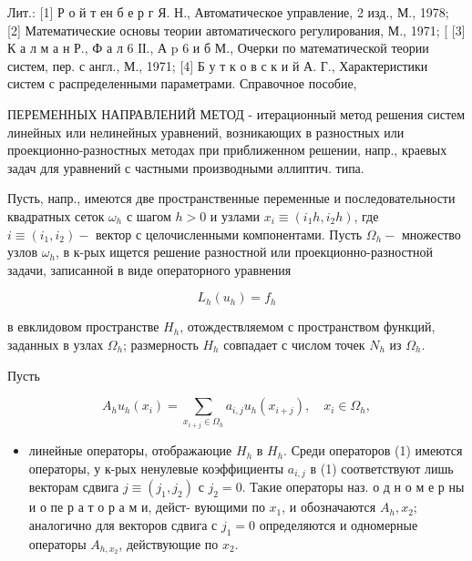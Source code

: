 \documentclass[10pt]{article}
\begin{document}
Лит.: [1] Р о й т ен б е р г Я. Н., Автоматическое управление, 2 изд., М., 1978; [2] Математические основы теории автоматического регулирования, М., 1971; [ [3] К а л м а н Р., Ф а л 6 ІІ., А p 6 и б М., Очерки по математической теории систем, пер. с англ., М., 1971; [4] Б у т к о в с к и й А. Г., Характеристики систем с распределенными параметрами. Справочное пособие,



ПЕРЕМЕННЫХ НАПРАВЛЕНИЙ МЕТОД - итерационный метод решения систем линейных или нелинейных уравнений, возникающих в разностных или проекционно-разностных методах при приближенном решении, напр., краевых задач для уравнений с частными производными әллиптич. типа.



Пусть, напр., имеются две пространственные переменные и последовательности квадратных сеток $\omega_{h}$ с шагом $h>0$ и узлами $x_{i} \equiv\left(i_{1} h, i_{2} h\right)$, где $i \equiv\left(i_{1}, i_{2}\right)-$ вектор с целочисленными компонентами. Пусть $\Omega_{h}-$ множество узлов $\omega_{h}$, в к-рых ищется решение разностной или проекционно-разностной задачи, записанной в виде операторного уравнения



\[

L_{h}\left(u_{h}\right)=f_{h}

\]



в евклидовом пространстве $H_{h}$, отождествляемом с пространством функций, заданных в узлах $\Omega_{h}$; размерность $H_{h}$ совпадает с числом точек $N_{h}$ из $\Omega_{h}$.



Пусть



\[

A_{h} u_{h}\left(x_{i}\right)=\sum_{x_{i+j} \in \Omega_{h}} a_{i, j} u_{h}\left(x_{i+j}\right), \quad x_{i} \in \Omega_{h},

\]



\begin{itemize}

  \item линейные операторы, отображаюцие $H_{h}$ в $H_{h}$. Среди операторов (1) имеются операторы, у к-рых ненулевые коэффициенты $a_{i, j}$ в (1) соответствуют лишь векторам сдвига $j \equiv\left(j_{1}, j_{2}\right)$ с $j_{2}=0$. Такие операторы наз. о д н о м е р ны и о пе р а т о р а м и, дейст- вующими по $x_{1}$, и обозначаются $A_{h}, x_{2} ;$ аналогично для векторов сдвига с $j_{1}=0$ определяются и одномерные операторы $A_{h, x_{2}}$, действующие по $x_{2}$.

\end{itemize}
\end{document}
